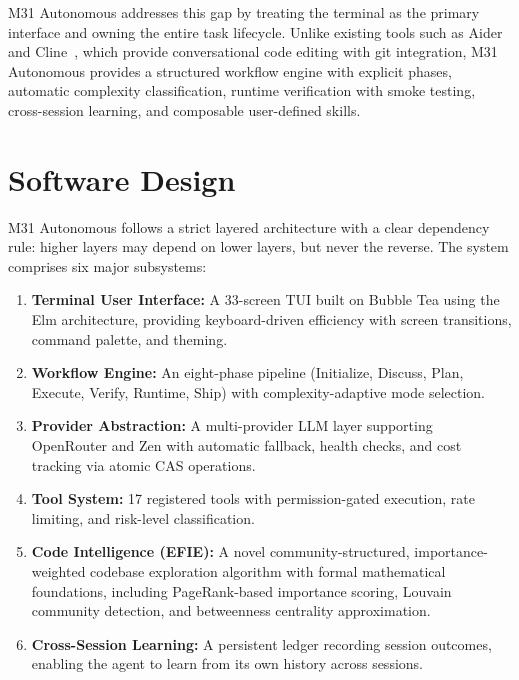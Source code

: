 \documentclass[11pt]{article}
\begin{document}
M31 Autonomous addresses this gap by treating the terminal as the primary interface and owning the entire task lifecycle. Unlike existing tools such as Aider~\cite{aider} and Cline~\cite{cline}, which provide conversational code editing with git integration, M31 Autonomous provides a structured workflow engine with explicit phases, automatic complexity classification, runtime verification with smoke testing, cross-session learning, and composable user-defined skills.

\section{Software Design}

M31 Autonomous follows a strict layered architecture with a clear dependency rule: higher layers may depend on lower layers, but never the reverse. The system comprises six major subsystems:

\begin{enumerate}
    \item \textbf{Terminal User Interface:} A 33-screen TUI built on Bubble Tea using the Elm architecture, providing keyboard-driven efficiency with screen transitions, command palette, and theming.
    
    \item \textbf{Workflow Engine:} An eight-phase pipeline (Initialize, Discuss, Plan, Execute, Verify, Runtime, Ship) with complexity-adaptive mode selection.
    
    \item \textbf{Provider Abstraction:} A multi-provider LLM layer supporting OpenRouter and Zen with automatic fallback, health checks, and cost tracking via atomic CAS operations.
    
    \item \textbf{Tool System:} 17 registered tools with permission-gated execution, rate limiting, and risk-level classification.
    
    \item \textbf{Code Intelligence (EFIE):} A novel community-structured, importance-weighted codebase exploration algorithm with formal mathematical foundations, including PageRank-based importance scoring, Louvain community detection, and betweenness centrality approximation.
    
    \item \textbf{Cross-Session Learning:} A persistent ledger recording session outcomes, enabling the agent to learn from its own history across sessions.
\end{enumerate}
\end{document}
